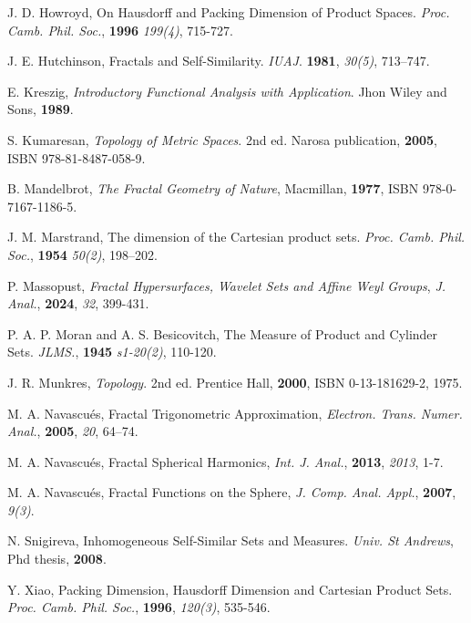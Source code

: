 \documentclass[10pt]{amsart}
\theoremstyle{definition}
\begin{document}
\begin{thebibliography}{}
		  J. D. Howroyd,  On Hausdorff and Packing Dimension of Product Spaces. {\em Proc. Camb. Phil. Soc.}, {\bf 1996} {\em 199(4)}, 715-727.
		
		
		  J. E. Hutchinson,  Fractals and Self-Similarity.  {\em IUAJ}. {\bf 1981}, {\em 30(5)}, 713–747.
		
		  E. Kreszig,  {\em Introductory Functional Analysis with Application}. Jhon Wiley and Sons, {\bf 1989}.
		
		 S. Kumaresan,  {\em Topology of Metric Spaces}. 2nd ed. Narosa publication, {\bf 2005}, ISBN 978-81-8487-058-9.
		
		 B.  Mandelbrot,  {\em The Fractal Geometry of Nature}, Macmillan, {\bf 1977}, ISBN 978-0-7167-1186-5.
		
		 J. M.  Marstrand,  The dimension of the Cartesian product sets. {\em Proc. Camb. Phil. Soc.}, {\bf 1954} {\em 50(2)}, 198–202.
		
		  P. Massopust,  {\em Fractal Hypersurfaces, Wavelet Sets and Affine Weyl Groups}, {\em J. Anal.}, {\bf 2024}, {\em 32}, 399-431.
		
		 P. A. P.  Moran and A. S. Besicovitch,  The Measure of Product and Cylinder Sets. {\em JLMS.}, {\bf 1945} {\em s1-20(2)}, 110-120.
		
		
		
		 J. R. Munkres,  {\em Topology}. 2nd ed.  Prentice Hall, {\bf 2000}, ISBN 0-13-181629-2, 1975.
		
		 M. A.  Navascu\'{e}s,  Fractal Trigonometric Approximation, {\em Electron. Trans. Numer. Anal.}, {\bf 2005}, {\em 20}, 64–74.
		
		 M. A.  Navascu\'{e}s, Fractal Spherical Harmonics, {\em Int. J. Anal.}, {\bf 2013}, {\em 2013}, 1-7.
		
		 M. A.  Navascu\'{e}s, Fractal Functions on the Sphere, {\em J. Comp. Anal. Appl.}, {\bf 2007}, {\em 9(3)}.
		
		
		 N. Snigireva,  Inhomogeneous Self-Similar Sets and Measures. {\em Univ. St Andrews}, Phd thesis, {\bf 2008}.
		
		
		
		 Y. Xiao,  Packing Dimension, Hausdorff Dimension and Cartesian Product Sets. {\em Proc. Camb. Phil. Soc.}, {\bf 1996}, {\em 120(3)}, 535-546.
		
		
		
		
		
		
		
		
		
		
		
		
		
		
		
		
		
		
		
		
		
		
		
		
		
		
		
		
		
	\end{thebibliography}
	
	
\end{document}
